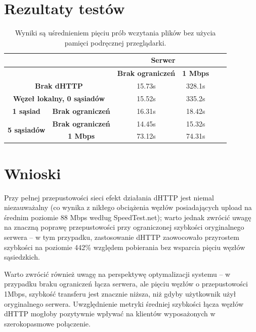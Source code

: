\section{Rezultaty testów}
\begin{table}[H]
\centering
    \begin{tabular}{|c|c|c|c|c|c|}
        \hline
         & & \multicolumn{2}{c|}{\textbf{Serwer}} \\ \hline
         & & \textbf{Brak ograniczeń} & \textbf{1 Mbps} \\ \hline
         \multicolumn{2}{|c|}{\textbf{Brak dHTTP}} & 15.73s & 328.1s \\ \hline
         \multicolumn{2}{|c|}{\textbf{Węzeł lokalny, 0 sąsiadów}} & 15.52s & 335.2s \\ \hline \hline
         \textbf{1 sąsiad} & \textbf{Brak ograniczeń} & 16.31s & 18.42s \\ \hline
         \multirow{2}{*}{\textbf{5 sąsiadów}} & \textbf{Brak ograniczeń} & 14.45s & 15.32s \\ 
          & \textbf{1 Mbps} & 73.12s & 74.31s \\  \hline
    \end{tabular}
    \label{tab:test-results}
    \caption{Wyniki są uśrednieniem pięciu prób wczytania plików bez użycia pamięci podręcznej przeglądarki.}
\end{table}

\section{Wnioski}

Przy pełnej przepustowości sieci efekt działania dHTTP jest niemal niezauważalny (co wynika z nikłego obciążenia węzłów posiadających upload na średnim poziomie 88 Mbps według SpeedTest.net); warto jednak zwrócić uwagę na znaczną poprawę przepustowości przy ograniczonej szybkości oryginalnego serwera -- w tym przypadku, zastosowanie dHTTP zaowocowało przyrostem szybkości na poziomie 442\% względem pobierania bez wsparcia pięciu węzłów sąsiedzkich.

Warto zwrócić również uwagę na perspektywę optymalizacji systemu -- w przypadku braku ograniczeń łącza serwera, ale pięciu węzłów o przepustowości 1Mbps, szybkość transferu jest znacznie niższa, niż gdyby użytkownik użył oryginalnego serwera. Uwzględnienie metryki średniej szybkości łącza węzłów dHTTP mogłoby pozytywnie wpływać na klientów wyposażonych w szerokopasmowe połączenie. 